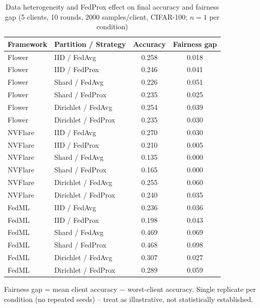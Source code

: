 \begin{table}[htbp]
\centering
\caption{Data heterogeneity and FedProx effect on final accuracy and fairness gap (5 clients, 10 rounds, 2000 samples/client, CIFAR-100; $n=1$ per condition)}
\label{tab:heterogeneity}
\begin{tabular}{llcc}
\toprule
Framework & Partition / Strategy & Accuracy & Fairness gap \\
\midrule
Flower  & IID / FedAvg        & 0.258 & 0.018 \\
Flower  & IID / FedProx       & 0.246 & 0.041 \\
Flower  & Shard / FedAvg      & 0.226 & 0.051 \\
Flower  & Shard / FedProx     & 0.235 & 0.025 \\
Flower  & Dirichlet / FedAvg  & 0.254 & 0.039 \\
Flower  & Dirichlet / FedProx & 0.235 & 0.030 \\
\addlinespace
NVFlare & IID / FedAvg        & 0.270 & 0.030 \\
NVFlare & IID / FedProx       & 0.210 & 0.005 \\
NVFlare & Shard / FedAvg      & 0.135 & 0.000 \\
NVFlare & Shard / FedProx     & 0.165 & 0.000 \\
NVFlare & Dirichlet / FedAvg  & 0.255 & 0.060 \\
NVFlare & Dirichlet / FedProx & 0.240 & 0.035 \\
\addlinespace
FedML   & IID / FedAvg        & 0.236 & 0.036 \\
FedML   & IID / FedProx       & 0.198 & 0.043 \\
FedML   & Shard / FedAvg      & 0.469 & 0.069 \\
FedML   & Shard / FedProx     & 0.468 & 0.098 \\
FedML   & Dirichlet / FedAvg  & 0.307 & 0.027 \\
FedML   & Dirichlet / FedProx & 0.289 & 0.059 \\
\bottomrule
\end{tabular}
\vspace{0.5em}
\footnotesize
Fairness gap = mean client accuracy $-$ worst-client accuracy. Single replicate per condition
(no repeated seeds) -- treat as illustrative, not statistically established.
\end{table}

